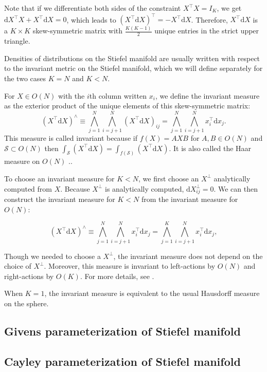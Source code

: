 \documentclass[11pt]{article}
\newcommand{\dv}[1]{\mathrm{d}{#1}}
\begin{document}
Note that if we differentiate both sides of the constraint $X^\top X = I_K$, we get $\dv{X}^\top X + X^\top \dv{X} = 0$, which leads to $(X^\top \dv{X})^\top = - X^\top \dv{X}$.
Therefore, $X^\top \dv{X}$ is a $K \times K$ skew-symmetric matrix with $\frac{K(K-1)}{2}$ unique entries in the strict upper triangle.

Densities of distributions on the Stiefel manifold are usually written with respect to the invariant metric on the Stiefel manifold, which we will define separately for the two cases $K=N$ and $K < N$.

For $X \in O(N)$ with the $i$th column written $x_i$, we define the invariant measure as the exterior product of the unique elements of this skew-symmetric matrix:
\[
  (X^\top \dv{X})^\wedge \equiv \bigwedge_{j=1}^N \bigwedge_{i=j+1}^N (X^\top \dv{X})_{ij} = \bigwedge_{j=1}^N \bigwedge_{i=j+1}^N x_i^\top \dv{x}_j.
\]
This measure is called invariant because if $f(X) = A X B$ for $A,B \in O(N)$ and $\mathcal{S} \subset O(N)$ then $\int_{\mathcal{S}} (X^\top \dv{X}) = \int_{f(\mathcal{S})} (X^\top \dv{X})$.
It is also called the Haar measure on $O(N)$ \cite{muirhead2009aspects}..

To choose an invariant measure for $K < N$, we first choose an $X^\perp$ analytically computed from $X$.
Because $X^\perp$ is analytically computed, $\dv{X^\perp_{ij}} = 0$.
We can then construct the invariant measure for $K<N$ from the invariant measure for $O(N)$:

\[
  (X^\top \dv{X})^\wedge \equiv \bigwedge_{j=1}^N \bigwedge_{i=j+1}^N x_i^\top \dv{x}_j = \bigwedge_{j=1}^K \bigwedge_{i=j+1}^N x_i^\top \dv{x}_j,
\]

Though we needed to choose a $X^\perp$, the invariant measure does not depend on the choice of $X^\perp$.
Moreover, this measure is invariant to left-actions by $O(N)$ and right-actions by $O(K)$.
For more details, see \cite{muirhead2009aspects}.

When $K=1$, the invariant measure is equivalent to the usual Hausdorff measure on the sphere.

\subsection{Givens parameterization of Stiefel manifold}

\subsection{Cayley parameterization of Stiefel manifold}
\end{document}
